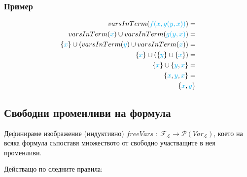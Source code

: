 \documentclass{article}[12pt]
\newcommand{\Lang}{\mathcal{L}}
\begin{document}
\subsubsection{Пример}

\begin{align*}
varsInTerm(\color{cyan} f(x, g(y, x))  \color{black}) = \\
varsInTerm(\color{cyan} x \color{black}) \cup varsInTerm(\color{cyan} g(y, x) \color{black}) = \\
\{\color{cyan} x \color{black}\} \cup (varsInTerm(\color{cyan} y \color{black}) \cup varsInTerm(\color{cyan} x \color{black})) = \\
\{\color{cyan} x \color{black}\} \cup (\{\color{cyan} y \color{black}\} \cup \{\color{cyan} x \color{black}\}) = \\
\{\color{cyan} x \color{black}\} \cup \{\color{cyan} y \color{black} , \color{cyan} x \color{black}\} = \\
\{\color{cyan} x \color{black} , \color{cyan} y \color{black} , \color{cyan} x \color{black}\} = \\
\{\color{cyan} x \color{black} , \color{cyan} y \color{black} \}
\end{align*}

\subsection{Свободни променливи на формула}

Дефинираме изображение (индуктивно) \(freeVars \; : \; \mathcal{F}_\Lang \to \mathcal{P}(Var_\Lang)\),
което на всяка формула съпоставя множеството от свободно участващите в нея променливи.

Действащо по следните правила:
\end{document}
